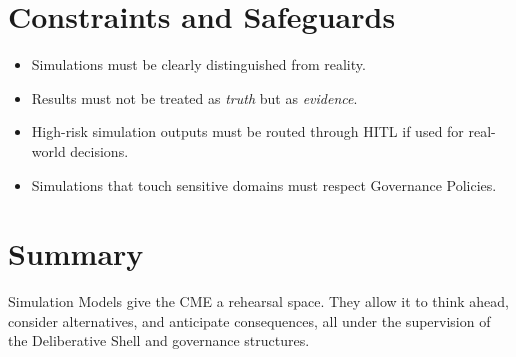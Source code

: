 \section{Constraints and Safeguards}

\begin{itemize}
    \item Simulations must be clearly distinguished from reality.
    \item Results must not be treated as \emph{truth} but as \emph{evidence}.
    \item High-risk simulation outputs must be routed through HITL if used
          for real-world decisions.
    \item Simulations that touch sensitive domains must respect Governance Policies.
\end{itemize}

\section{Summary}

Simulation Models give the CME a rehearsal space. They allow it to think ahead,
consider alternatives, and anticipate consequences, all under the supervision
of the Deliberative Shell and governance structures.

